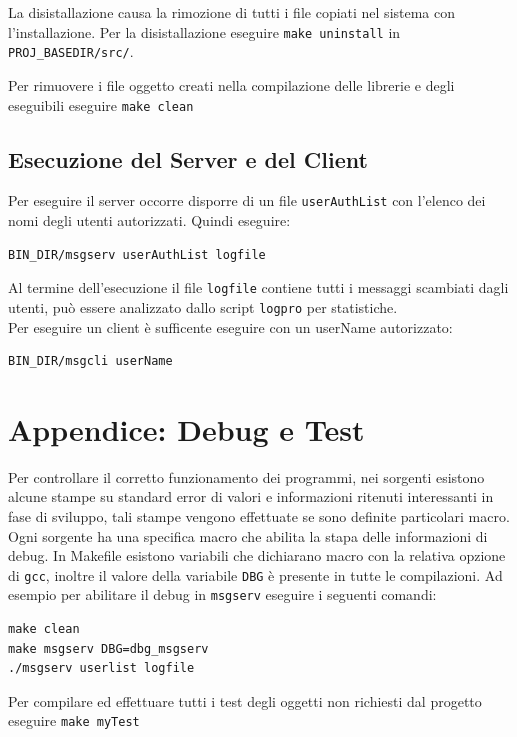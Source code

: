 \documentclass[a4paper,10pt]{article}
\begin{document}
La disistallazione causa la rimozione di tutti i file copiati nel
sistema con l'installazione. Per la disistallazione eseguire
\texttt{make uninstall} in \texttt{PROJ\_BASEDIR\-/src/}. 

Per rimuovere i file oggetto creati nella compilazione delle librerie
e degli eseguibili eseguire \texttt{make clean}

\subsection{Esecuzione del Server e del Client}
Per eseguire il server occorre disporre di un file
\texttt{userAuthList} con l'elenco dei nomi degli utenti
autorizzati. Quindi eseguire:
\begin{verbatim}
BIN_DIR/msgserv userAuthList logfile 
\end{verbatim}
Al termine dell'esecuzione il file \texttt{logfile} contiene tutti i
messaggi scambiati dagli utenti, pu\`o essere analizzato dallo script
\texttt{logpro} per statistiche.\\Per eseguire un client \`e
sufficente eseguire con un userName autorizzato:
\begin{verbatim}
BIN_DIR/msgcli userName
\end{verbatim}

\section{Appendice: Debug e Test}
Per controllare il corretto funzionamento dei programmi, nei sorgenti
esistono alcune stampe su standard error di valori e informazioni
ritenuti interessanti in fase di sviluppo, tali stampe vengono
effettuate se sono definite particolari macro. Ogni sorgente ha una
specifica macro che abilita la stapa delle informazioni di debug. In
Makefile esistono variabili che dichiarano macro con la relativa
opzione di \texttt{gcc}, inoltre il valore della variabile \texttt{DBG} \`e
presente in tutte le compilazioni. Ad esempio per abilitare il debug
in \texttt{msgserv} eseguire i seguenti comandi:
\begin{verbatim}
make clean
make msgserv DBG=dbg_msgserv
./msgserv userlist logfile
\end{verbatim}
Per compilare ed effettuare tutti i test degli oggetti non richiesti
dal progetto eseguire \texttt{make myTest}
\end{document}
